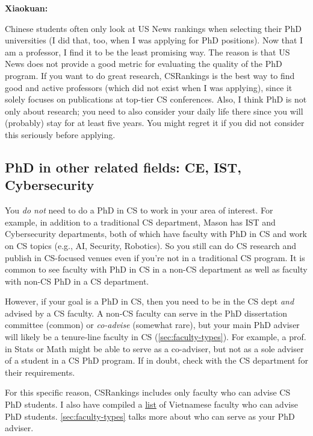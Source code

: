 \documentclass[oneside,11pt,dvipsnames]{book}
\newenvironment{commentbox}[1][]{
  \small
  \begin{mybox}
    {\small \textbf{#1}}
  }{
  \end{mybox}
}
\begin{document}
\begin{commentbox}[Xiaokuan:]
  Chinese students often only look at US News rankings when selecting their PhD universities (I did that, too, when I was applying for PhD positions).
  Now that I am a professor, I find it to be the least promising way.
  The reason is that US News does not provide a good metric for evaluating the quality of the PhD program.
  If you want to do great research, CSRankings is the best way to find good and active professors (which did not exist when I was applying),
  since it solely focuses on publications at top-tier CS conferences.
  Also,
  I think PhD is not only about research;
  you need to also consider your daily life there since you will (probably) stay for at least five years.
  You might regret it if you did not consider this seriously before applying.
\end{commentbox}


\subsection{PhD in other related fields: CE, IST, Cybersecurity}\label{sec:related-fields}

You \emph{do not} need to do a PhD in CS to work in your area of interest. For example, in addition to a traditional CS department, Mason has IST and Cybersecurity departments, both of which have faculty with PhD in CS and work on CS topics (e.g., AI, Security, Robotics).  So you still can do CS research and publish in CS-focused venues even if you're not in a traditional CS program.  It is common to see faculty with PhD in CS in a non-CS department as well as faculty with non-CS PhD in a CS department.

However, if your goal is a PhD in CS, then you need to be in the CS dept \emph{and} advised by a CS faculty. A non-CS faculty can serve in the PhD dissertation committee (common) or \emph{co-advise} (somewhat rare), but your main PhD adviser will likely be a tenure-line faculty in CS (\autoref{sec:faculty-types}).
For example, a prof. in Stats or Math might be able to serve as a co-adviser, but not as a sole adviser of a student in a CS PhD program. 
If in doubt, check with the CS department for their requirements.

For this specific reason,  CSRankings includes only faculty who can advise CS PhD students. I also have compiled a \href{https://github.com/dynaroars/dynaroars.github.io/wiki/Viet-CS-Profs-US}{list} of Vietnamese faculty who can advise PhD students. \autoref{sec:faculty-types} talks more about who can serve as your PhD adviser.
\end{document}
